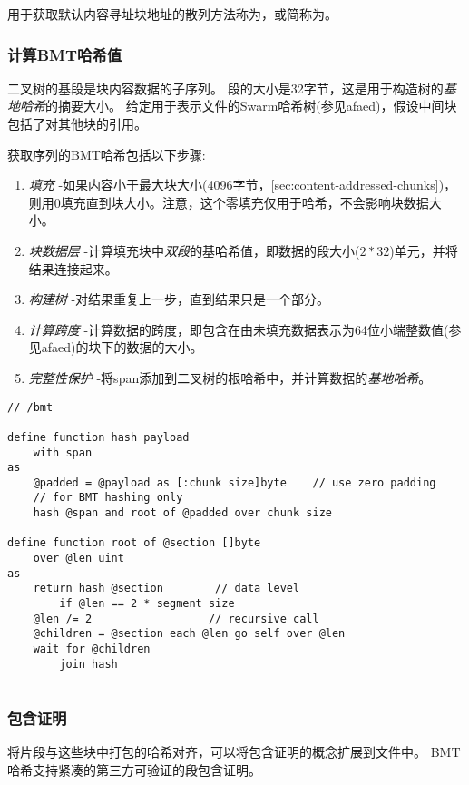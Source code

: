 用于获取默认内容寻址块地址的散列方法称为，或简称为。 

\subsubsection{计算BMT哈希值}

二叉树的基段是块内容数据的子序列。 
段的大小是32字节，这是用于构造树的\emph{基地哈希}的摘要大小。 
给定用于表示文件的Swarm哈希树(参见afaed)，假设中间块包括了对其他块的引用。 

获取序列的BMT哈希包括以下步骤:

\begin{enumerate}
\item \emph{填充} -如果内容小于最大块大小(4096字节，\ref{sec:content-addressed-chunks})，则用0填充直到块大小。注意，这个零填充仅用于哈希，不会影响块数据大小。
\item \emph{块数据层} -计算填充块中\emph{双段}的基哈希值，即数据的段大小($2 * 32$)单元，并将结果连接起来。
\item \emph{构建树} -对结果重复上一步，直到结果只是一个部分。
\item \emph{计算跨度} -计算数据的跨度，即包含在由未填充数据表示为64位小端整数值(参见afaed)的块下的数据的大小。            
\item \emph{完整性保护} -将span添加到二叉树的根哈希中，并计算数据的\emph{基地哈希}。
\end{enumerate}

\begin{definition}\label{def:bmt-hash}
\begin{lstlisting}[language=buzz1]
// /bmt

define function hash payload 
    with span
as
    @padded = @payload as [:chunk size]byte    // use zero padding 
    // for BMT hashing only
    hash @span and root of @padded over chunk size 
    
define function root of @section []byte
    over @len uint
as
    return hash @section        // data level
        if @len == 2 * segment size
    @len /= 2                  // recursive call
    @children = @section each @len go self over @len
    wait for @children 
        join hash
    

\end{lstlisting}
\end{definition}

\subsubsection{包含证明}

将片段与这些块中打包的哈希对齐，可以将包含证明的概念扩展到文件中。
BMT哈希支持紧凑的第三方可验证的段包含证明。

